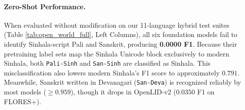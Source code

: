 \documentclass[11pt]{article}
\begin{document}
\begin{table}[t]
\centering
\small
\setlength{\tabcolsep}{3.5pt}
\caption{Macro-F1 across 11 languages on FLORES+, CommonLID, and WiLI-2018 ($N=7,047$ target + background test sets) under Zero-Shot, Target-Only Fine-Tuned, and Continual Multilingual Rehearsal (Aya) conditions.}
\label{tab:open_world_full}
\end{table}

\paragraph{Zero-Shot Performance.}
When evaluated without modification on our 11-language hybrid test suites (Table \ref{tab:open_world_full}, Left Columns), all six foundation models fail to identify Sinhala-script Pali and Sanskrit, producing \textbf{0.0000 F1}. Because their pretraining label sets map the Sinhala Unicode block exclusively to modern Sinhala, both \texttt{Pali-Sinh} and \texttt{San-Sinh} are classified as Sinhala. This misclassification also lowers modern Sinhala's F1 score to approximately $0.791$. Meanwhile, Sanskrit written in Devanagari (\texttt{San-Deva}) is recognized reliably by most models ($\ge 0.959$), though it drops in OpenLID-v2 ($0.0350$ F1 on FLORES+).
\end{document}
